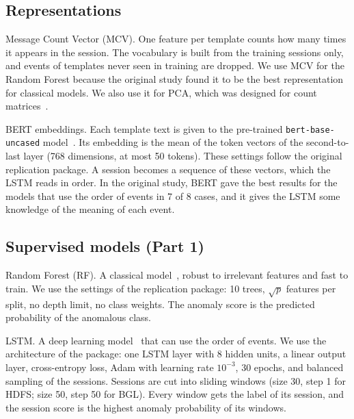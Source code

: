 \documentclass[10pt, conference]{IEEEtran}
\renewcommand{\paragraph}[1]{\noindent\textsf{#1}.}
\begin{document}
\subsection{Representations}

\paragraph{Message Count Vector (MCV)} One feature per template counts how many times it appears in the session. The vocabulary is built from the training sessions only, and events of templates never seen in training are dropped. We use MCV for the Random Forest because the original study found it to be the best representation for classical models. We also use it for PCA, which was designed for count matrices~\cite{xu2009detecting}.

\paragraph{BERT embeddings} Each template text is given to the pre-trained \texttt{bert-base-uncased} model~\cite{devlin2019bert}. Its embedding is the mean of the token vectors of the second-to-last layer (768 dimensions, at most 50 tokens). These settings follow the original replication package. A session becomes a sequence of these vectors, which the LSTM reads in order. In the original study, BERT gave the best results for the models that use the order of events in 7 of 8 cases, and it gives the LSTM some knowledge of the meaning of each event.

\subsection{Supervised models (Part 1)}

\paragraph{Random Forest (RF)} A classical model~\cite{breiman2001random}, robust to irrelevant features and fast to train. We use the settings of the replication package: 10 trees, $\sqrt{p}$ features per split, no depth limit, no class weights. The anomaly score is the predicted probability of the anomalous class.

\paragraph{LSTM} A deep learning model~\cite{hochreiter1997lstm} that can use the order of events. We use the architecture of the package: one LSTM layer with 8 hidden units, a linear output layer, cross-entropy loss, Adam with learning rate $10^{-3}$, 30 epochs, and balanced sampling of the sessions. Sessions are cut into sliding windows (size 30, step 1 for HDFS; size 50, step 50 for BGL). Every window gets the label of its session, and the session score is the highest anomaly probability of its windows.
\end{document}
